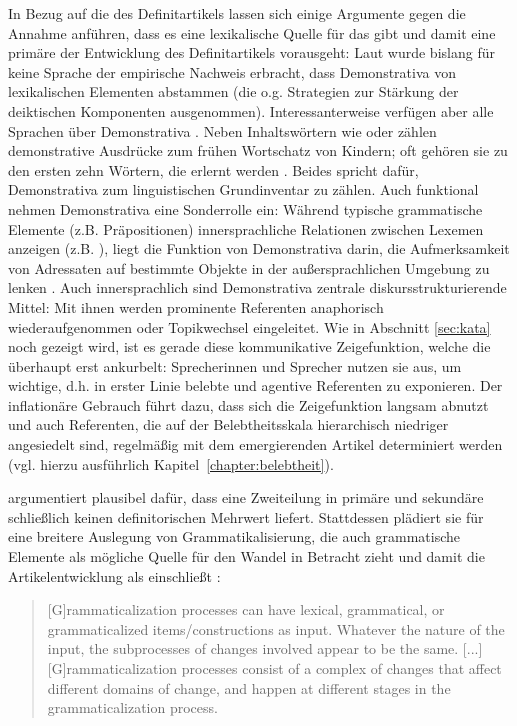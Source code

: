 In Bezug auf die  des Definitartikels  lassen sich einige Argumente gegen die Annahme anführen, dass es eine lexikalische Quelle für das  gibt und damit eine primäre  der Entwicklung des Definitartikels vorausgeht: Laut \textcite[150]{Diessel1999} wurde bislang für keine Sprache der empirische Nachweis erbracht, dass Demonstrativa  von lexikalischen Elementen abstammen (die o.g. Strategien zur Stärkung der deiktischen Komponenten ausgenommen). Interessanterweise verfügen aber alle Sprachen über Demonstrativa  \parencite[1]{Diessel1999}. Neben Inhaltswörtern wie  oder  zählen demonstrative Ausdrücke zum frühen Wortschatz von Kindern; oft gehören sie zu den ersten zehn Wörtern, die erlernt werden \parencite[476]{Diessel2006}. Beides spricht dafür, Demonstrativa  zum linguistischen Grundinventar zu zählen. Auch funktional nehmen Demonstrativa  eine Sonderrolle ein: Während typische grammatische Elemente (z.B. Präpositionen) innersprachliche Relationen zwischen Lexemen anzeigen (z.B. ), liegt die Funktion von Demonstrativa  darin, die Aufmerksamkeit von Adressaten auf bestimmte Objekte in der außersprachlichen Umgebung zu lenken \parencites{Diessel2006}. 
Auch innersprachlich sind Demonstrativa  zentrale diskursstrukturierende Mittel: Mit ihnen werden prominente Referenten anaphorisch  wiederaufgenommen oder Topikwechsel  eingeleitet. Wie in Abschnitt \ref{sec:kata} noch gezeigt wird, ist es gerade diese kommunikative Zeigefunktion, welche die  überhaupt erst ankurbelt: Sprecherinnen und Sprecher nutzen sie aus, um wichtige, d.h. in erster Linie belebte und agentive Referenten zu exponieren. Der inflationäre Gebrauch führt dazu, dass sich die Zeigefunktion langsam abnutzt und auch Referenten, die auf der Belebtheitsskala  hierarchisch niedriger angesiedelt sind, regelmäßig mit dem emergierenden Artikel determiniert werden (vgl. hierzu ausführlich Kapitel~\ref{chapter:belebtheit}).


\textcite{Breban2014} argumentiert plausibel dafür, dass eine Zweiteilung in primäre und sekundäre  schließlich keinen definitorischen Mehrwert liefert.
Stattdessen plädiert sie für eine breitere Auslegung von Grammatikalisierung, die auch grammatische Elemente als mögliche Quelle für den Wandel in Betracht zieht und damit die Artikelentwicklung als  einschließt  \parencite[zur weiterführenden Diskussion s.][]{Breban2012}: \blockcquote[498]{Breban2014}{[G]rammaticalization processes can have lexical, grammatical, or grammaticalized items/constructions as input. Whatever the nature of the input, the subprocesses of changes involved appear to be the same. [...] [G]ramma\-ticalization processes consist of a complex of changes that affect different domains of change, and happen at different stages in the grammaticalization process.}


